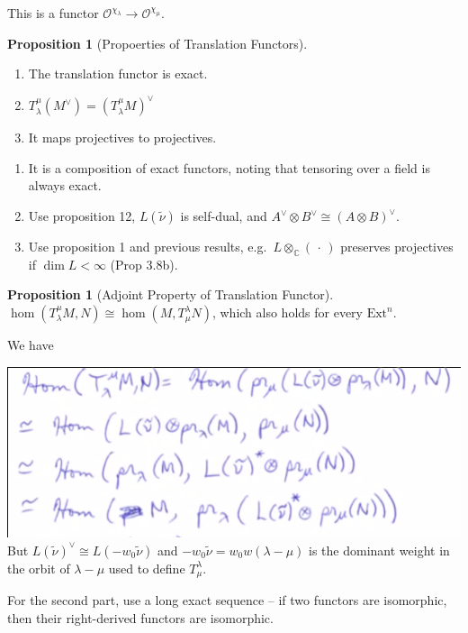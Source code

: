 \documentclass[11pt]{scrartcl}
\theoremstyle{definition}
\theoremstyle{theorem}
\newtheorem{proposition}[theorem]{Proposition}
\theoremstyle{proof}
\newenvironment{proof}
{\pushQED{$\qed$}\pf}
{\par\popQED\endpf}
\theoremstyle{definition}
\theoremstyle{break}
\theoremstyle{problem}
\providecommand{\tightlist}{%
  \setlength{\itemsep}{0pt}\setlength{\parskip}{0pt}}
\DeclarePairedDelimiter\qty{(}{)}
\renewcommand{\qty}[1]{{\left(  {#1} \right)}}
\newcommand{\CC}[0]{{\mathbb{C}}}
\newcommand{\ext}[0]{\text{Ext}}
\newcommand{\dual}[0]{^\vee}
\newcommand{\OO}[0]{{\mathcal{O}}}
\newcommand{\tensor}[0]{\otimes}
\newcommand{\wait}[0]{{\,\cdot\,}}
\renewcommand{\qed}[0]{\hfill\blacksquare}
\renewcommand{\to}[0]{\longrightarrow}
\begin{document}
This is a functor \(\OO^{\chi_\lambda} \to \OO^{\chi_\mu}\).

\begin{proposition}[Propoerties of Translation Functors]

\hfill

\begin{enumerate}
\def\labelenumi{\arabic{enumi}.}
\tightlist
\item
  The translation functor is exact.
\item
  \(T_\lambda^\mu (M\dual) = \qty{T_\lambda^\mu M}\dual\)
\item
  It maps projectives to projectives.
\end{enumerate}

\end{proposition}

\begin{proof}

\hfill

\begin{enumerate}
\def\labelenumi{\arabic{enumi}.}
\tightlist
\item
  It is a composition of exact functors, noting that tensoring over a
  field is always exact.
\item
  Use proposition 12, \(L(\tilde \nu)\) is self-dual, and
  \(A\dual \tensor B\dual \cong (A\tensor B)\dual\).
\item
  Use proposition 1 and previous results, e.g.~\(L \tensor_\CC (\wait)\)
  preserves projectives if \(\dim L < \infty\) (Prop 3.8b).
\end{enumerate}

\end{proof}

\begin{proposition}[Adjoint Property of Translation Functor]

\(\hom(T_\lambda^\mu M, N) \cong \hom(M, T_\mu^\lambda N)\), which also
holds for every \(\ext^n\).\end{proposition}

\begin{proof}

We have

\includegraphics{figures/image_2020-04-10-09-26-51.png}\\

But \(L(\tilde \nu)\dual \cong L(-w_0 \tilde \nu)\) and
\(-w_0 \tilde \nu = w_0 w(\lambda - \mu)\) is the dominant weight in the
orbit of \(\lambda - \mu\) used to define \(T_\mu^\lambda\).

For the second part, use a long exact sequence -- if two functors are
isomorphic, then their right-derived functors are isomorphic.\end{proof}
\end{document}

